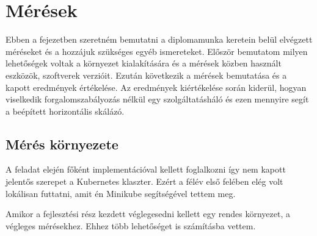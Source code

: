 \chapter{Mérések}
\label{sec:results}
Ebben a fejezetben szeretném bemutatni a diplomamunka keretein belül elvégzett méréseket és a hozzájuk szükséges egyéb ismereteket.
Először bemutatom milyen lehetőségek voltak a környezet kialakítására és a mérések közben használt eszközök, szoftverek verzióit.
Ezután következik a mérések bemutatása és a kapott eredmények értékelése.
Az eredmények kiértékelése során kiderül, hogyan viselkedik forgalomszabályozás nélkül egy szolgáltatásháló és ezen mennyire segít a beépített horizontális skálázó.

\section{Mérés környezete}
A feladat elején főként implementációval kellett foglalkozni így nem kapott jelentős szerepet a Kubernetes klaszter. Ezért  a félév első felében elég volt lokálisan futtatni, amit én Minikube segítségével tettem meg. 

Amikor a fejlesztési rész kezdett véglegesedni kellett egy rendes környezet, a végleges mérésekhez. Ehhez több lehetőséget is számításba vettem.	

